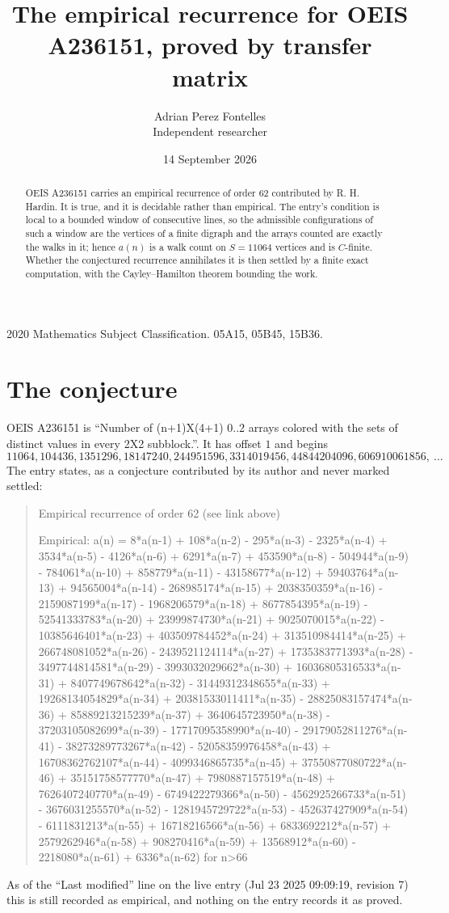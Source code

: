 \documentclass[11pt,a4paper]{article}
\title{The empirical recurrence for OEIS A236151, proved by transfer matrix}
\author{Adrian Perez Fontelles\\ \small Independent researcher}
\date{14 September 2026}
\theoremstyle{plain}
\theoremstyle{definition}
\begin{document}
\maketitle

\begin{abstract}
OEIS A236151 carries an empirical recurrence of order $62$ contributed by R. H. Hardin. It is
true, and it is decidable rather than empirical. The entry's condition is local to a bounded window of consecutive lines, so
the admissible configurations of such a window are the vertices of a finite digraph and the
arrays counted are exactly the walks in it; hence $a(n)$ is a walk count on $S=11064$ vertices
and is $C$-finite. Whether the conjectured recurrence annihilates it is then settled by a
finite exact computation, with the Cayley--Hamilton theorem bounding the work.
\end{abstract}

\noindent\small 2020 Mathematics Subject Classification. 05A15, 05B45, 15B36.\normalsize

\section{The conjecture}

OEIS A236151 is ``Number of (n+1)X(4+1) 0..2 arrays colored with the sets of distinct values in every 2X2 subblock.''. It has offset $1$ and begins
\[
11064, 104436, 1351296, 18147240, 244951596, 3314019456, 44844204096, 606910061856,\ \dots
\]
The entry states, as a conjecture contributed by its author and never marked settled:
\begin{quote}\raggedright\small
Empirical recurrence of order 62 (see link above)

Empirical: a(n) = 8*a(n-1) + 108*a(n-2) - 295*a(n-3) - 2325*a(n-4) + 3534*a(n-5) - 4126*a(n-6) + 6291*a(n-7) + 453590*a(n-8) - 504944*a(n-9) - 784061*a(n-10) + 858779*a(n-11) - 43158677*a(n-12) + 59403764*a(n-13) + 94565004*a(n-14) - 268985174*a(n-15) + 2038350359*a(n-16) - 2159087199*a(n-17) - 1968206579*a(n-18) + 8677854395*a(n-19) - 52541333783*a(n-20) + 23999874730*a(n-21) + 9025070015*a(n-22) - 10385646401*a(n-23) + 403509784452*a(n-24) + 313510984414*a(n-25) + 266748081052*a(n-26) - 2439521124114*a(n-27) + 1735383771393*a(n-28) - 3497744814581*a(n-29) - 3993032029662*a(n-30) + 16036805316533*a(n-31) + 8407749678642*a(n-32) - 31449312348655*a(n-33) + 19268134054829*a(n-34) + 20381533011411*a(n-35) - 28825083157474*a(n-36) + 85889213215239*a(n-37) + 3640645723950*a(n-38) - 37203105082699*a(n-39) - 17717095358990*a(n-40) - 29179052811276*a(n-41) - 38273289773267*a(n-42) - 52058359976458*a(n-43) + 16708362762107*a(n-44) - 4099346865735*a(n-45) + 37550877080722*a(n-46) + 35151758577770*a(n-47) + 7980887157519*a(n-48) + 7626407240770*a(n-49) - 6749422279366*a(n-50) - 4562925266733*a(n-51) - 3676031255570*a(n-52) - 1281945729722*a(n-53) - 452637427909*a(n-54) - 6111831213*a(n-55) + 16718216566*a(n-56) + 6833692212*a(n-57) + 2579262946*a(n-58) + 908270416*a(n-59) + 13568912*a(n-60) - 2218080*a(n-61) + 6336*a(n-62) for n>66
\end{quote}
As of the ``Last modified'' line on the live entry (Jul 23 2025 09:09:19, revision 7) this is still
recorded as empirical, and nothing on the entry records it as proved.
\end{document}
